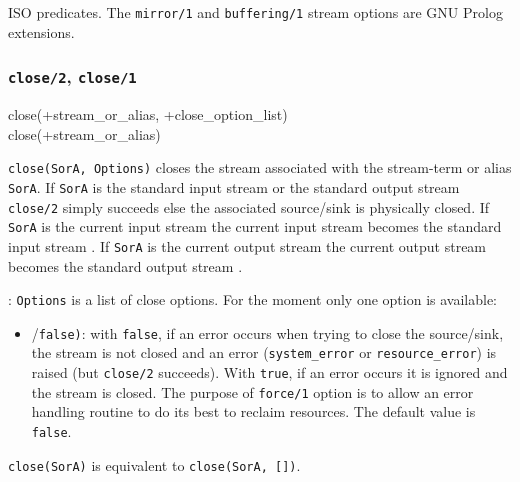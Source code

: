 \Portability

ISO predicates. The \texttt{mirror/1} and \texttt{buffering/1} stream options
are GNU Prolog extensions.

\subsubsection{\texttt{close/2},
               \texttt{close/1}}
\label{close/2}

\begin{TemplatesOneCol}
close(+stream\_or\_alias, +close\_option\_list)\\
close(+stream\_or\_alias)

\end{TemplatesOneCol}

\Description

\texttt{close(SorA, Options)} closes the stream associated with the stream-term
or alias \texttt{SorA}. If \texttt{SorA} is the standard input stream or the
standard output stream \texttt{close/2} simply succeeds else the associated
source/sink is physically closed. If \texttt{SorA} is the current input
stream the current input stream becomes the standard input stream
. If \texttt{SorA} is the current output stream the
current output stream becomes the standard output stream
.

: \texttt{Options} is a list of close options. For the
moment only one option is available:

\begin{itemize}

\item {}/\texttt{false)}: with \texttt{false}, if
an error occurs when trying to close the source/sink, the stream is not
closed and an error (\texttt{system\_error} or \texttt{resource\_error}) is
raised (but \texttt{close/2} succeeds). With \texttt{true}, if an error
occurs it is ignored and the stream is closed. The purpose of
\texttt{force/1} option is to allow an error handling routine to do its best
to reclaim resources. The default value is \texttt{false}.

\end{itemize}

\texttt{close(SorA)} is equivalent to \texttt{close(SorA, [])}.

